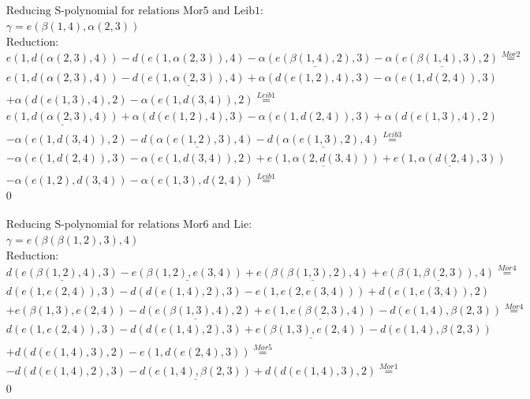 \documentclass[11pt]{amsart}
\begin{document}
\begin{align*} 
& \text{Reducing S-polynomial for relations Mor5 and Leib1:} \\ 
& \gamma = e(\beta(1,4),\alpha(2,3)) \\ 
& \text{Reduction}: \\&e(1,d(\alpha(2,3),4)) - d(e(1,\alpha(2,3)),4) - \underline{\alpha(e(\beta(1,4),2),3)} - \underline{\alpha(e(\beta(1,4),3),2)} \stackrel{ Mor2 }{=}  \\ 
&e(1,d(\alpha(2,3),4)) - \underline{d(e(1,\alpha(2,3)),4)} + \alpha(d(e(1,2),4),3) - \alpha(e(1,d(2,4)),3)\\ 
 &  + \alpha(d(e(1,3),4),2) - \alpha(e(1,d(3,4)),2) \stackrel{ Leib1 }{=}  \\ 
&\underline{e(1,d(\alpha(2,3),4))} + \alpha(d(e(1,2),4),3) - \alpha(e(1,d(2,4)),3) + \alpha(d(e(1,3),4),2)\\ 
 &  - \alpha(e(1,d(3,4)),2) - \underline{d(\alpha(e(1,2),3),4)} - \underline{d(\alpha(e(1,3),2),4)} \stackrel{ Leib3 }{=}  \\ 
& - \alpha(e(1,d(2,4)),3) - \alpha(e(1,d(3,4)),2) + \underline{e(1,\alpha(2,d(3,4)))} + \underline{e(1,\alpha(d(2,4),3))}\\ 
 &  - \alpha(e(1,2),d(3,4)) - \alpha(e(1,3),d(2,4)) \stackrel{ Leib1 }{=}  \\ 
&0\\ 
\end{align*} 
 
\begin{align*} 
& \text{Reducing S-polynomial for relations Mor6 and Lie:} \\ 
& \gamma = e(\beta(\beta(1,2),3),4) \\ 
& \text{Reduction}: \\&\underline{d(e(\beta(1,2),4),3)} - \underline{e(\beta(1,2),e(3,4))} + \underline{e(\beta(\beta(1,3),2),4)} + \underline{e(\beta(1,\beta(2,3)),4)} \stackrel{ Mor4 }{=}  \\ 
&d(e(1,e(2,4)),3) - d(d(e(1,4),2),3) - e(1,e(2,e(3,4))) + d(e(1,e(3,4)),2)\\ 
 &  + e(\beta(1,3),e(2,4)) - \underline{d(e(\beta(1,3),4),2)} + \underline{e(1,e(\beta(2,3),4))} - d(e(1,4),\beta(2,3)) \stackrel{ Mor4 }{=}  \\ 
&d(e(1,e(2,4)),3) - d(d(e(1,4),2),3) + \underline{e(\beta(1,3),e(2,4))} - d(e(1,4),\beta(2,3))\\ 
 &  + d(d(e(1,4),3),2) - e(1,d(e(2,4),3)) \stackrel{ Mor5 }{=}  \\ 
& - d(d(e(1,4),2),3) - \underline{d(e(1,4),\beta(2,3))} + d(d(e(1,4),3),2) \stackrel{ Mor1 }{=}  \\ 
&0\\ 
\end{align*} 
 
\end{document}
